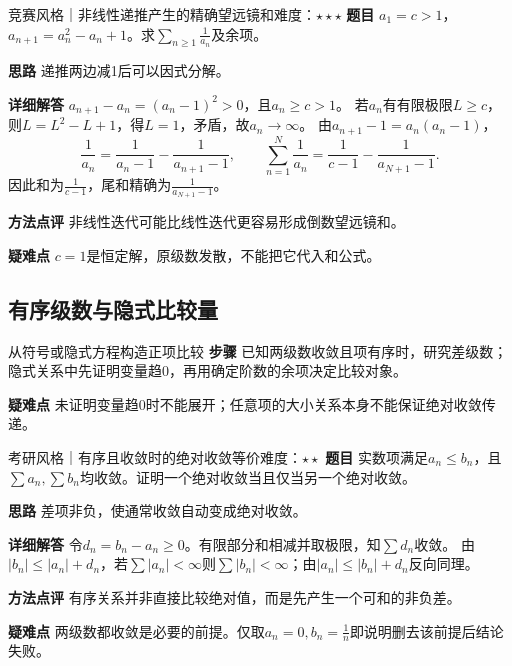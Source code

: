 \begin{example}{竞赛风格｜非线性递推产生的精确望远镜和}{难度：$\star\star\star$}\label{cse:ex:nonlinear}
\textbf{题目} $a_1=c>1$，$a_{n+1}=a_n^2-a_n+1$。求$\sum_{n\ge1}\frac{1}{a_n}$及余项。
\par\textbf{思路} 递推两边减1后可以因式分解。
\par\textbf{详细解答} $a_{n+1}-a_n=(a_n-1)^2>0$，且$a_n\ge c>1$。
若$a_n$有有限极限$L\ge c$，则$L=L^2-L+1$，得$L=1$，矛盾，故$a_n\to\infty$。
由$a_{n+1}-1=a_n(a_n-1)$，
\[
\dfrac1{a_n}=\dfrac1{a_n-1}-\dfrac1{a_{n+1}-1},
\qquad
\sum_{n=1}^N\dfrac1{a_n}
=\dfrac1{c-1}-\dfrac1{a_{N+1}-1}.
\]
因此和为$\frac{1}{c-1}$，尾和精确为$\frac{1}{a_{N+1}-1}$。
\par\textbf{方法点评} 非线性迭代可能比线性迭代更容易形成倒数望远镜和。
\par\textbf{疑难点} $c=1$是恒定解，原级数发散，不能把它代入和公式。
\end{example}

\subsection{有序级数与隐式比较量}\label{cse:implicit}
\begin{method}{从符号或隐式方程构造正项比较}
\textbf{步骤} 已知两级数收敛且项有序时，研究差级数；隐式关系中先证明变量趋0，再用确定阶数的余项决定比较对象。
\par\textbf{疑难点} 未证明变量趋0时不能展开；任意项的大小关系本身不能保证绝对收敛传递。
\end{method}
\begin{example}{考研风格｜有序且收敛时的绝对收敛等价}{难度：$\star\star$}\label{cse:ex:ordered}
\textbf{题目} 实数项满足$a_n\le b_n$，且$\sum a_n,\sum b_n$均收敛。证明一个绝对收敛当且仅当另一个绝对收敛。
\par\textbf{思路} 差项非负，使通常收敛自动变成绝对收敛。
\par\textbf{详细解答} 令$d_n=b_n-a_n\ge0$。有限部分和相减并取极限，知$\sum d_n$收敛。
由$|b_n|\le|a_n|+d_n$，若$\sum|a_n|<\infty$则$\sum|b_n|<\infty$；由$|a_n|\le|b_n|+d_n$反向同理。
\par\textbf{方法点评} 有序关系并非直接比较绝对值，而是先产生一个可和的非负差。
\par\textbf{疑难点} 两级数都收敛是必要的前提。仅取$a_n=0,b_n=\frac{1}{n}$即说明删去该前提后结论失败。
\end{example}

